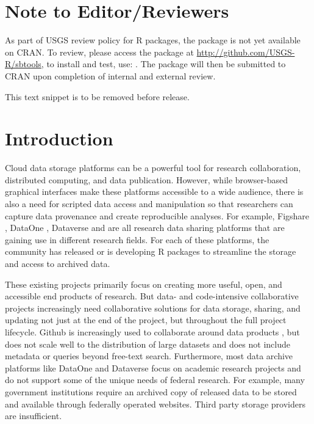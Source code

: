 
\section{Note to Editor/Reviewers}

As part of USGS review policy for R packages, the  package is not 
yet available on CRAN. To review, please access the package at 
\url{http://github.com/USGS-R/sbtools}, to install and test, use: 
. The  package will 
then be submitted to CRAN upon completion of internal and external review. 

This text snippet is to be removed before release.

\section{Introduction}

Cloud data storage platforms can be a powerful tool for research collaboration,
distributed computing, and data publication. However, while browser-based graphical
interfaces make these platforms accessible to a wide audience, there is also
a need for scripted data access and manipulation so that researchers can capture 
data provenance and create reproducible analyses. For example,
Figshare , DataOne , Dataverse  
and  are all research data
sharing platforms that are gaining use in different research fields. For each of these
platforms, the community has released \citep{rfigshare, dvn, ckanr} or is
developing \citep{dataone} R packages to streamline the storage and access
to archived data. 

These existing projects primarily focus on creating more useful, open, and
accessible end products of research. But data- and code-intensive collaborative projects
increasingly need collaborative solutions for data storage, sharing, and updating
not just at the end of the project, but throughout the full project lifecycle. 
Github is increasingly used to collaborate around data products \citep{GandrudGithub}, 
but does not scale well to the distribution of large datasets \citep{Delcambre2013} and does not
include metadata or queries beyond free-text search. Furthermore, 
most data archive platforms like DataOne and Dataverse 
focus on academic research projects and do not support some
of the unique needs of federal research. For example, many government institutions
require an archived copy of released data to be stored and available through federally
operated websites. Third party storage providers are insufficient.

